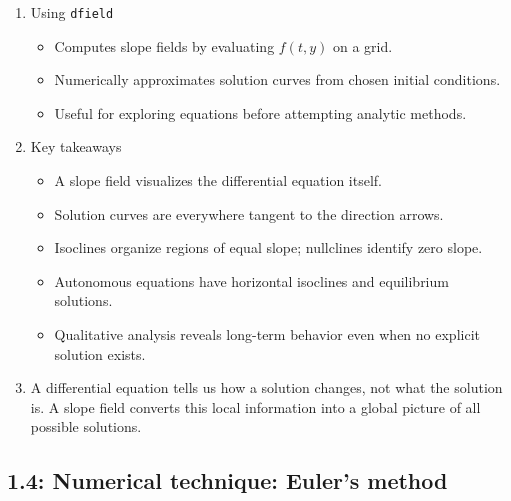 \documentclass{article}
\begin{document}
\begin{enumerate}
\item Using \texttt{dfield}

\begin{itemize}
\item Computes slope fields by evaluating $f(t,y)$ on a grid.
\item Numerically approximates solution curves from chosen initial conditions.
\item Useful for exploring equations before attempting analytic methods.
\end{itemize}

\item Key takeaways

\begin{itemize}
\item A slope field visualizes the differential equation itself.
\item Solution curves are everywhere tangent to the direction arrows.
\item Isoclines organize regions of equal slope; nullclines identify zero slope.
\item Autonomous equations have horizontal isoclines and equilibrium solutions.
\item Qualitative analysis reveals long-term behavior even when no explicit solution exists.
\end{itemize}

\item A differential equation tells us how a solution changes, not what the solution is. A slope field converts this local information into a global picture of all possible solutions.
\end{enumerate}



\subsection{1.4: Numerical technique: Euler's method}
\end{document}
